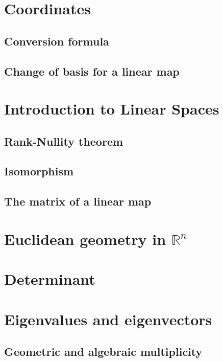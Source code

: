 \documentclass{article}
\theoremstyle{definition}
\begin{document}
\newpage

\section{Coordinates}
\subsection{Conversion formula}
\subsection{Change of basis for a linear map}

\newpage


\section{Introduction to Linear Spaces}
\subsection{Rank-Nullity theorem} 
\subsection{Isomorphism}
\subsection{The matrix of a linear map}

\newpage

\section{Euclidean geometry in $\mathbb{R}^n$}

\newpage
\section{Determinant}

\newpage
\section{Eigenvalues and eigenvectors}
\subsection{Geometric and algebraic multiplicity}
\end{document}
